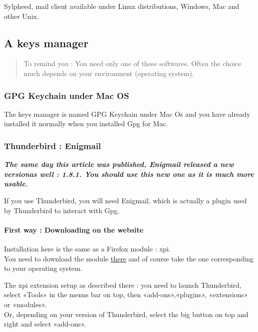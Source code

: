 Sylpheed, mail client available under Linux distributions, Windows, Mac
and other Unix.

\subsection{A keys manager}\label{a-keys-manager}

\begin{quote}
To remind you : You need only one of these softwares. Often the choice
much depends on your environment (operating system).
\end{quote}

\subsubsection{GPG Keychain under Mac
OS}\label{gpg-keychain-under-mac-os}

The keys manager is named GPG Keychain under Mac Os and you have already
installed it normally when you installed Gpg for Mac.

\subsubsection{Thunderbird : Enigmail}\label{thunderbird-enigmail}

\textbf{\emph{The same day this article was published, Enigmail released
a new versionas well : 1.8.1. You should use this new one as it is much
more usable.}}

If you use Thunderbird, you will need Enigmail, which is actually a
plugin used by Thunderbird to interact with Gpg.

\paragraph{First way : Downloading on the
website}\label{first-way-downloading-on-the-website}

Installation here is the same as a Firefox module : xpi.\\You need to
download the module \href{https://www.enigmail.net/download/}{there} and
of course take the one corresponding to your operating system.

The xpi extension setup as described there : you need to launch
Thunderbird, select «Tools» in the menus bar on top, then
«add-ons»,«plugins», «extensions» or «modules».\\Or, depending on your
version of Thunderbird, select the big button on top and right and
select «add-ons».

